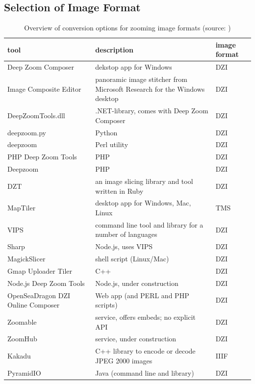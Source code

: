 \subsection{Selection of Image Format}
\begin{table}[H]
	\begin{center}
		\begin{tabular}{| p{3cm} | p{4cm} | p{2.5cm} |}
			\hline
			\textbf{tool} & \textbf{description} & \textbf{image format} \\
			\hline
			Deep Zoom Composer & dekstop app for Windows & DZI \\ \hline
			Image Composite Editor & panoramic image stitcher from Microsoft Research for the Windows desktop & DZI \\ \hline
			DeepZoomTools.dll & .NET-library, comes with Deep Zoom Composer & DZI \\ \hline
			deepzoom.py & Python & DZI \\ \hline
			deepzoom & Perl utility & DZI \\ \hline
			PHP Deep Zoom Tools & PHP & DZI \\ \hline
			Deepzoom & PHP & DZI \\ \hline
			DZT & an image slicing library and tool written in Ruby & DZI \\ \hline
			MapTiler &  desktop app for Windows, Mac, Linux & TMS \\ \hline
			VIPS & command line tool and library for a number of languages & DZI \\ \hline
			Sharp & Node.js, uses VIPS & DZI \\ \hline
			MagickSlicer & shell script (Linux/Mac) & DZI \\ \hline
			Gmap Uploader Tiler & C++ & DZI \\ \hline
			Node.js Deep Zoom Tools & Node.js, under construction & DZI \\ \hline
			OpenSeaDragon DZI Online Composer & Web app (and PERL and PHP scripts) & DZI \\ \hline
			Zoomable & service, offers embeds; no explicit API & DZI \\ \hline
			ZoomHub & service, under construction & DZI \\ \hline
			Kakadu & C++ library to encode or decode JPEG 2000 images & IIIF \\ \hline
			PyramidIO & Java (command line and library) & DZI \\ \hline
		\end{tabular}
		\caption{Overview of conversion options for zooming image formats (source: \cite{web:openseadragon})}
		\label{tab3.2}
	\end{center}
\end{table}

